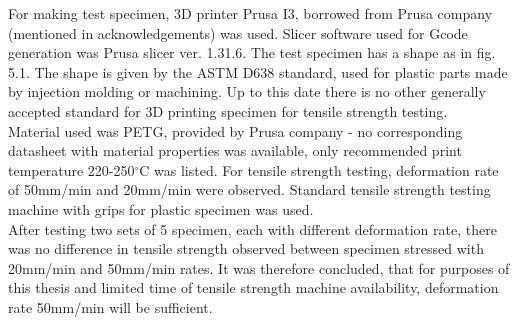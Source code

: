 \documentclass[a4paper, twoside, 11pt]{report}
\begin{document}
For making test specimen, 3D printer Prusa I3, borrowed from Prusa company (mentioned in acknowledgements) was used. Slicer software used for Gcode generation was Prusa slicer ver. 1.31.6. The test specimen has a shape as in fig. 5.1. The shape is given by the ASTM D638 standard, used for plastic parts made by injection molding or machining. Up to this date there is no other generally accepted standard for 3D printing specimen for tensile strength testing.\\
Material used was PETG, provided by Prusa company - no corresponding datasheet with material properties was available, only recommended print temperature 220-250$^{\circ}$C was listed. For tensile strength testing, deformation rate of 50mm/min and 20mm/min were observed. Standard tensile strength testing machine with grips for plastic specimen was used.\\
After testing two sets of 5 specimen, each with different deformation rate, there was no difference in tensile strength observed between specimen stressed with 20mm/min and 50mm/min rates. It was therefore concluded, that for purposes of this thesis and limited time of tensile strength machine availability, deformation rate 50mm/min will be sufficient.
%
\newpage
\end{document}
